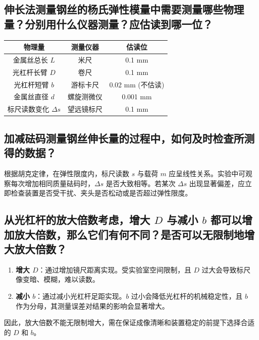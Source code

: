 \documentclass[]{../template/Report}%
\begin{document}
\begin{fullreportonly}
    \subsection{伸长法测量钢丝的杨氏弹性模量中需要测量哪些物理量？分别用什么仪器测量？应估读到哪一位？}
    \begin{table}[H]
        \centering
        \begin{tabular}{ccc}
            \toprule
            物理量               & 测量仪器  & 估读位           \\
            \midrule
            金属丝总长 $L$         & 米尺    & 0.1 mm        \\
            光杠杆长臂 $D$         & 卷尺    & 0.1 mm        \\
            光杠杆短臂 $b$         & 游标卡尺  & 0.02 mm (不估读) \\
            金属丝直径 $d$         & 螺旋测微仪 & 0.001 mm      \\
            标尺读数变化 $\Delta s$ & 望远镜标尺 & 0.1 mm        \\
            \bottomrule
        \end{tabular}
    \end{table}

    \subsection{加减砝码测量钢丝伸长量的过程中，如何及时检查所测得的数据？}
    根据胡克定律，在弹性限度内，标尺读数 $s$ 与载荷 $m$ 应呈线性关系。实验中可观察每次增加相同质量砝码时，$\Delta s$ 是否大致相等。若某次 $\Delta s$ 出现显著偏差，应立即检查装置是否受干扰、夹头是否松动或是否超过弹性限度。

    \subsection{从光杠杆的放大倍数考虑，增大 $D$ 与减小 $b$ 都可以增加放大倍数，那么它们有何不同？是否可以无限制地增大放大倍数？}
    \begin{enumerate}
        \item \textbf{增大 $D$}：通过增加镜尺距离实现。受实验室空间限制，且 $D$ 过大会导致标尺像变暗、模糊，难以读数。
        \item \textbf{减小 $b$}：通过减小光杠杆足距实现。$b$ 过小会降低光杠杆的机械稳定性，且 $b$ 作为分母，其测量误差对结果的影响会显著增大。
    \end{enumerate}
    因此，放大倍数不能无限制增大，需在保证成像清晰和装置稳定的前提下选择合适的 $D$ 和 $b$。
\end{fullreportonly}
\insertnotes
\end{document}
